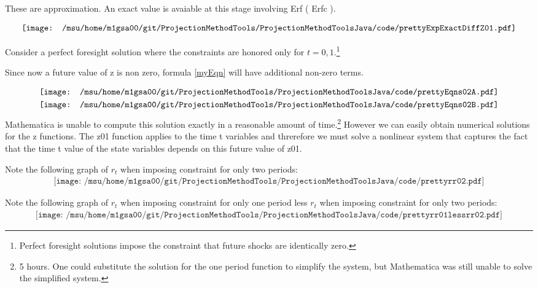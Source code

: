\documentclass[12pt]{article}
\begin{document}
These are approximation. An exact value is avaiable at this stage involving 
Erf ( Erfc ).

\begin{gather*}
  \vcenter{\hbox{\texttt{[image: /msu/home/m1gsa00/git/ProjectionMethodTools/ProjectionMethodToolsJava/code/prettyExpExactDiffZ01.pdf]}}}\\
\end{gather*}

Consider a perfect foresight solution where the constraints are honored only 
for $t=0,1$.\footnote{ Perfect foresight solutions impose the constraint that future shocks are identically zero.}

Since now a future value of z is non zero, formula \ref{myEqn}  will have additional non-zero terms.


\begin{gather*}
  \vcenter{\hbox{\texttt{[image: /msu/home/m1gsa00/git/ProjectionMethodTools/ProjectionMethodToolsJava/code/prettyEqns02A.pdf]}}}\\
  \vcenter{\hbox{\texttt{[image: /msu/home/m1gsa00/git/ProjectionMethodTools/ProjectionMethodToolsJava/code/prettyEqns02B.pdf]}}}\\
\end{gather*}
Mathematica is unable to compute this solution exactly in a reasonable amount
of time.\footnote{ 5 hours.  One could substitute the solution for the one period function to simplify the system, but Mathematica was still unable to solve the simplified system.}  However we can easily obtain numerical solutions for the z functions.  The z01 function applies to the time t variables and 
threrefore we must solve a nonlinear system that captures the fact that
the time t value of the state variables depends on this future value of z01.


Note the following graph of $r_t$ when imposing constraint for only two periods:
\begin{gather*}
\texttt{[image: /msu/home/m1gsa00/git/ProjectionMethodTools/ProjectionMethodToolsJava/code/prettyrr02.pdf]}
\end{gather*}



Note the following graph of $r_t$ when imposing constraint for only one period
less $r_t$ when imposing constraint for only two periods:
\begin{gather*}
\texttt{[image: /msu/home/m1gsa00/git/ProjectionMethodTools/ProjectionMethodToolsJava/code/prettyrr01lessrr02.pdf]}
\end{gather*}
\end{document}
